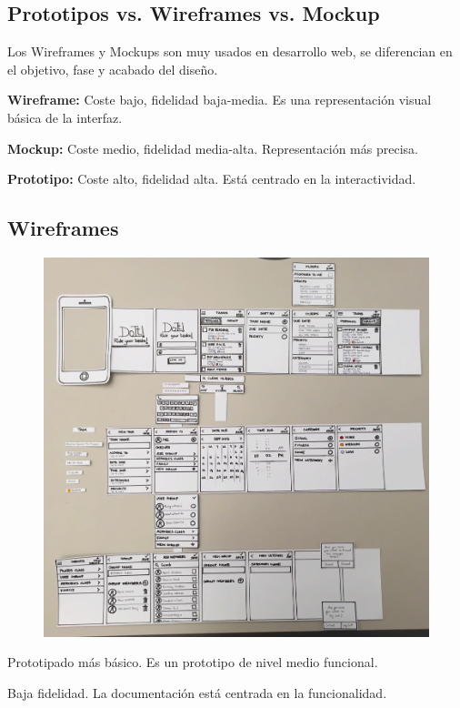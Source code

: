 \documentclass[12pt, twoside, openright]{report} %
\begin{document}
\subsection{Prototipos vs. Wireframes vs. Mockup}
Los Wireframes y Mockups son muy usados en desarrollo web, se diferencian en el objetivo, fase y acabado del diseño.

\textbf{Wireframe:} Coste bajo, fidelidad baja-media. Es una representación visual básica de la interfaz.

\textbf{Mockup:} Coste medio, fidelidad media-alta. Representación más precisa.

\textbf{Prototipo:} Coste alto, fidelidad alta. Está centrado en la interactividad.

\subsection{Wireframes}

\begin{figure}[H]
	{\includegraphics[scale=.4]{2021-03-20 23_51_33-L5.pdf - Foxit Reader.png}}
\end{figure}

Prototipado más básico. Es un prototipo de nivel medio funcional.

Baja fidelidad. La documentación está centrada en la funcionalidad.
\end{document}
